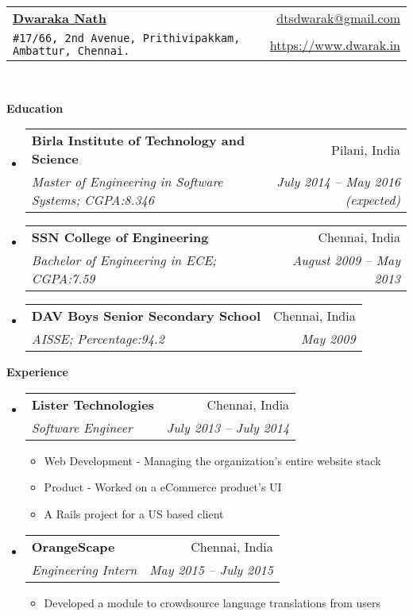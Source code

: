 \documentclass[letterpaper,11pt]{article}
\makeatletter
\newcommand{\resitem}[1]{\item #1 \vspace{-2pt}}
\newcommand{\resheading}[1]{{\large \colorbox{mygrey}{\begin{minipage}{\textwidth}{\textbf{#1 \vphantom{p\^{E}}}}\end{minipage}}}}
\newcommand{\ressubheading}[4]{
\begin{tabular*}{6.5in}{l@{\extracolsep{\fill}}r}
		\textbf{#1} & #2 \\
		\textit{#3} & \textit{#4} \\
\end{tabular*}\vspace{-6pt}}
\makeatother
\begin{document}
\newcommand{\mywebheader}{
\begin{tabular*}{7in}{l@{\extracolsep{\fill}}r}
	\textbf{\href{https://www.dwarak.in/}{\LARGE Dwaraka Nath}} & \href{mailto:dtsdwarak@gmail.com}{dtsdwarak@gmail.com}\\
	{\footnotesize \texttt{\#17/66, 2nd Avenue, Prithivipakkam, Ambattur, Chennai.}} & \href{https://www.dwarak.in}{https://www.dwarak.in} \\
	\end{tabular*}
\\
\vspace{0.1in}}

\mywebheader

\resheading{Education}
	\begin{itemize}
		\item
			\ressubheading{{Birla Institute of Technology and Science}}{Pilani, India}{{Master of Engineering in Software Systems};{ CGPA:8.346}}{July 2014 -- May 2016 (expected)}
		\item
			\ressubheading{{SSN College of Engineering}}{Chennai, India}{{Bachelor of Engineering in ECE};{ CGPA:7.59}}{August 2009 -- May 2013}
		\item
			\ressubheading{{DAV Boys Senior Secondary School}}{Chennai, India}{{AISSE};{ Percentage:94.2}}{May 2009}			
	\end{itemize} %


\resheading{Experience}
	\begin{itemize}
		\item 
			\ressubheading{{Lister Technologies}}{Chennai, India}
				{Software Engineer}{July 2013 -- July 2014}
				{ \footnotesize
				\begin{itemize}
					\resitem{Web Development - Managing the organization's entire website stack}
					\resitem{Product - Worked on a eCommerce product's UI}
					\resitem{A Rails project for a US based client}
				\end{itemize}
				}
        \item 
			\ressubheading{{OrangeScape}}{Chennai, India}
				{Engineering Intern}{May 2015 -- July 2015}
				{ \footnotesize
				\begin{itemize}
					\resitem{Developed a module to crowdsource language translations from users}
				\end{itemize}
				}
	\end{itemize}  %
\end{document}

